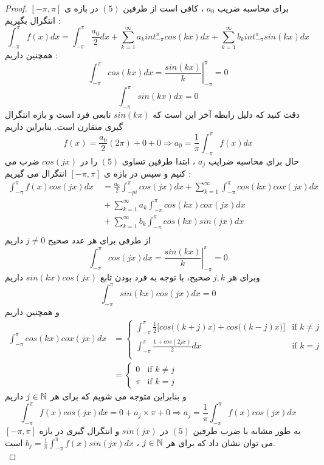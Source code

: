 
 \begin{proof}
  برای محاسبه ضریب
 $a_0$
 ، کافی است از طرفین 
 $(5)$
 در بازه ی
 $[-\pi,\pi]$
 انتگرال بگیریم : 
 \[
 \int_{-\pi}^\pi {f(x)dx}=\int_{-\pi}^\pi{\frac{a_0}{2}}dx+\sum_{k=1}^\infty a_k{int_{-\pi}^\pi{cos(kx)dx}}+\sum_{k=1}^\infty b_k{int_{-\pi}^\pi{sin(kx)dx}}
 \]
 همچنین داریم :
 \[
 \int_{-\pi}^\pi{cos(kx)dx}=\left.\frac{sin(kx)}{k}\right |_{-\pi}^\pi=0
 \]
 \[
  \int_{-\pi}^\pi{sin(kx)dx}=0
 \]
 دقت کنید که دلیل رابطه آخر این است که
 $sin(kx)$
 تابعی فرد است و بازه انتگرال گیری متقارن است. بنابراین داریم
 \[
  f(x)=\frac{a_0}{2}(2\pi)+0+0\Rightarrow  a_0=\frac{1}{\pi}\int_{-\pi}^\pi {f(x)dx}
 \]
 حال برای محاسبه ضرایب 
 $a_j$
 ، ابتدا طرفین تساوی 
 $(5)$
 را در 
 $cos(jx)$
 ضرب می کنیم و سپس در بازه ی 
 $[-\pi,\pi]$
 انتگرال می گیریم :
 \begin{equation*}
 \begin{aligned}
 \int_{-\pi}^\pi{f(x)cos(jx)dx} {} &\ =\frac{a_0}{2}\int_{-pi}^\pi{cos(jx)dx}+\sum_{k=1}^\infty{\int_{-\pi}^\pi{cos(kx)cox(jx)dx}} \\
 &\ +\sum_{k=1}^\infty{a_k\int_{-\pi}^\pi{cos(kx)cox(jx)dx}} \\
 &\ +\sum_{k=1}^\infty{b_k\int_{-\pi}^\pi{cos(kx)sin(jx)dx}} \\
 \end{aligned}
 \end{equation*}
 از طرفی برای هر عدد صحیح
 $j\ne0$
 داریم
 \[
 \int_{-\pi}^\pi{cos(jx)dx}=\left.{\frac{sin(kx)}{k}}\right |_{-\pi}^\pi=0
 \]
 وبرای هر 
 $j,k$
 صحیح، با توجه به فرد بودن تابع
 $sin(kx)cos(jx)$
 داریم
 \[
 \int_{-\pi}^\pi{sin(kx)cos(jx)dx}=0
 \]
 و همچنین داریم
\begin{align*}
 \int_{-\pi}^\pi{cos(kx)cox(jx)dx}&=
\begin{cases}
\int_{-\pi}^\pi{\frac{1}{2}\Big[cos\big((k+j)x\big)+cos\big((k-j)x\big)\Big]} &\mbox{if } k\ne j\\
\int_{-\pi}^\pi{\frac{1+cos(2jx)}{2}dx}   
	&\mbox{if } k=j\\
\end{cases}
\\
&=\begin{cases}
0 &\mbox{if } k\ne j
\\
\pi &\mbox{if } k=j
\end{cases}
\end{align*}
 و بنابراین متوجه می شویم که برای هر 
 $j\in\mathbb{N}$
 داریم
 \[
 \int_{-\pi}^\pi{f(x)cos(jx)dx} {} = 0+a_j\times\pi+0\Rightarrow a_j=\frac{1}{\pi}\int_{-\pi}^\pi{f(x)cos(jx)dx}
 \]
 به طور مشابه با ضرب طرفین
 $(5)$
 در
 $sin(jx)$
 و انتگرال گیری در بازه
 $[-\pi,\pi]$
 می توان نشان داد که برای هر 
 $j\in\mathbb{N}$
 ،
 $b_j=\frac{1}{\pi}\int_{-\pi}^\pi{f(x)sin(jx)dx}$
 است.\\
 \end{proof}
 
